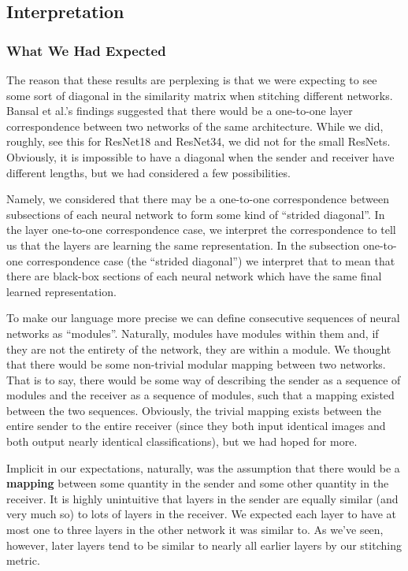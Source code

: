 \documentclass{article} %
\begin{document}
\subsection*{Interpretation}
\subsubsection*{What We Had Expected}
The reason that these results are perplexing is that we were expecting to see some sort of diagonal in the similarity matrix
when stitching
different networks. Bansal et al.'s findings suggested that there would be a one-to-one layer correspondence between
two networks of the same architecture. While we did, roughly, see this for ResNet18 and ResNet34, we did not for the
small ResNets. Obviously, it is impossible to have a diagonal when the sender and receiver have different lengths,
but we had considered a few possibilities.

Namely, we considered that there may be a one-to-one correspondence between subsections of each neural network to
form some kind of ``strided diagonal''. In the layer one-to-one correspondence case, we interpret the correspondence
to tell us that the layers are learning the same representation. In the subsection one-to-one correspondence case
(the ``strided diagonal'') we interpret that to mean that there are black-box sections of each neural network which
have the same final learned representation.

To make our language more precise we can define consecutive sequences of neural networks as ``modules''. Naturally,
modules have modules within them and, if they are not the entirety of the network, they are within a module. We thought
that there would be some non-trivial modular mapping between two networks. That is to say, there would be some way of
describing the sender as a sequence of modules and the receiver as a sequence of modules, such that a mapping existed
between the two sequences. Obviously, the trivial mapping exists between the entire sender to the entire receiver
(since they both input identical images and both output nearly identical classifications), but we had hoped for more.

Implicit in our expectations, naturally, was the assumption that there would be a \textbf{mapping} between some quantity
in the sender and some other quantity in the receiver. It is highly unintuitive that layers in the sender are equally
similar (and very much so) to lots of layers in the receiver. We expected each layer to have at most one to three layers
in the other network it was similar to. As we've seen, however, later layers tend to be similar to nearly all earlier layers
by our stitching metric.
\end{document}
